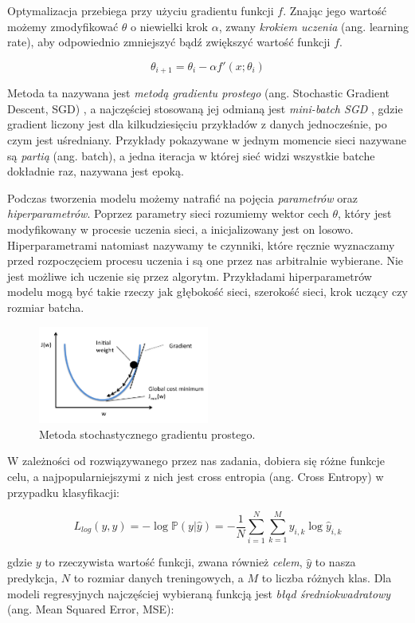 \documentclass[licencjacka]{pracamgr}
\begin{document}
Optymalizacja przebiega przy użyciu gradientu funkcji $ f $. Znając jego wartość możemy zmodyfikować $\theta$ o niewielki krok $ \alpha $, zwany \emph{krokiem uczenia} (ang. learning rate), aby odpowiednio zmniejszyć bądź zwiększyć wartość funkcji $ f $. 

$$ \theta_{i+1} = \theta_i - \alpha f'(x; \theta_i) $$

Metoda ta nazywana jest \emph{metodą gradientu prostego} (ang. Stochastic Gradient Descent, SGD) \cite{sgd}, a najczęściej stosowaną jej odmianą jest \emph{mini-batch SGD} \cite{mini-batch-sgd}, gdzie gradient liczony jest dla kilkudziesięciu przykładów z danych jednocześnie, po czym jest uśredniany. Przykłady pokazywane w jednym momencie sieci nazywane są \emph{partią} (ang. batch), a jedna iteracja w której sieć widzi wszystkie batche dokładnie raz, nazywana jest epoką.

Podczas tworzenia modelu możemy natrafić na pojęcia \emph{parametrów} oraz \emph{hiperparametrów}. Poprzez parametry sieci rozumiemy wektor cech $\theta$, który jest modyfikowany w procesie uczenia sieci, a inicjalizowany jest on losowo. Hiperparametrami natomiast nazywamy te czynniki, które ręcznie wyznaczamy przed rozpoczęciem procesu uczenia i są one przez nas arbitralnie wybierane. Nie jest możliwe ich uczenie się przez algorytm. Przykładami hiperparametrów modelu mogą być takie rzeczy jak głębokość sieci, szerokość sieci, krok uczący czy rozmiar batcha.

\begin{figure}[ht]
  \centering
  \includegraphics[width=0.5\textwidth]{sgd}
  \caption{Metoda stochastycznego gradientu prostego.}
\end{figure}

W zależności od rozwiązywanego przez nas zadania, dobiera się różne funkcje celu, a najpopularniejszymi z nich jest cross entropia (ang. Cross Entropy) w przypadku klasyfikacji:

$$ L_{log}(y, \hat{y}) = -\log\mathbb{P}(y | \hat{y}) = 
-\frac{1}{N} \sum_{i = 1}^N \sum_{k = 1}^M y_{i, k} \log \hat{y}_{i, k}
$$

gdzie $y$ to rzeczywista wartość funkcji, zwana również \emph{celem}, $\hat{y}$ to nasza predykcja, $N$ to rozmiar danych treningowych, a $M$ to liczba różnych klas. Dla modeli regresyjnych najczęściej wybieraną funkcją jest \emph{błąd średniokwadratowy} (ang. Mean Squared Error, MSE):
\end{document}
